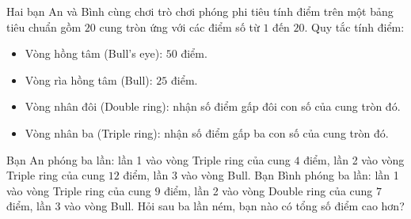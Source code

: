 \begin{bt}%
Hai bạn An và Bình cùng chơi trò chơi phóng phi tiêu tính điểm trên một bảng tiêu chuẩn gồm $20$ cung tròn ứng với các điểm số từ $1$ đến $20$. Quy tắc tính điểm:
\begin{itemize}
    \item Vòng hồng tâm (Bull's eye): $50$ điểm.
    \item Vòng rìa hồng tâm (Bull): $25$ điểm.
    \item Vòng nhân đôi (Double ring): nhận số điểm gấp đôi con số của cung tròn đó.
    \item Vòng nhân ba (Triple ring): nhận số điểm gấp ba con số của cung tròn đó.
\end{itemize}
Bạn An phóng ba lần: lần 1 vào vòng Triple ring của cung $4$ điểm, lần 2 vào vòng Triple ring của cung $12$ điểm, lần 3 vào vòng Bull.
Bạn Bình phóng ba lần: lần 1 vào vòng Triple ring của cung $9$ điểm, lần 2 vào vòng Double ring của cung $7$ điểm, lần 3 vào vòng Bull.
Hỏi sau ba lần ném, bạn nào có tổng số điểm cao hơn?
\end{bt}

